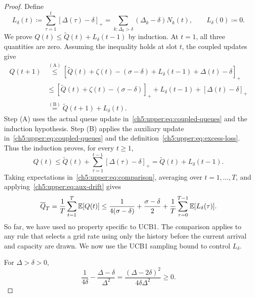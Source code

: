 \begin{proof}
Define
\begin{equation}
 L_\delta(t)\coloneqq\sum_{\tau=1}^{t}[\Delta(\tau)-\delta]_+
 =\sum_{k:\Delta_k>\delta}(\Delta_k-\delta)N_k(t),
 \qquad L_\delta(0)\coloneqq0.
 \label{ch5:upper:eq:excess-loss}
\end{equation}
We prove $Q(t)\le\widetilde Q(t)+L_\delta(t-1)$ by induction.
At $t=1$, all three quantities are zero. Assuming the inequality holds
at slot $t$, the coupled updates give
\begin{equation*}
\begin{aligned}
Q(t+1)
&\overset{\mathrm{(A)}}{\le}
 [\widetilde Q(t)+\zeta(t)-(\sigma-\delta)
   +L_\delta(t-1)+\Delta(t)-\delta]_+\\
&\le
 [\widetilde Q(t)+\zeta(t)-(\sigma-\delta)]_+
 +L_\delta(t-1)+[\Delta(t)-\delta]_+\\
&\overset{\mathrm{(B)}}{=}\widetilde Q(t+1)+L_\delta(t).
\end{aligned}
\end{equation*}
Step (A) uses the actual queue update in~\eqref{ch5:upper:eq:coupled-queues}
and the induction hypothesis.
Step (B) applies the auxiliary update in~\eqref{ch5:upper:eq:coupled-queues}
and the definition~\eqref{ch5:upper:eq:excess-loss}.
Thus the induction proves, for every $t\ge1$,
\begin{equation}
 Q(t)\le\widetilde Q(t)+\sum_{\tau=1}^{t-1}[\Delta(\tau)-\delta]_+
 =\widetilde Q(t)+L_\delta(t-1).
 \label{ch5:upper:eq:comparison}
\end{equation}
Taking expectations in~\eqref{ch5:upper:eq:comparison}, averaging over
$t=1,\ldots,T$, and applying~\eqref{ch5:upper:eq:aux-drift} gives
\begin{equation}
 \overline Q_T=\frac1T\sum_{t=1}^{T}\mathbb{E}[Q(t)]
 \le\frac{1}{4(\sigma-\delta)}+\frac{\sigma-\delta}{2}
 +\frac1T\sum_{\tau=0}^{T-1}\mathbb{E}[L_\delta(\tau)].
 \label{ch5:upper:eq:comparison-transfer}
\end{equation}
So far, we have used no property specific to UCB1. The comparison applies
to any rule that selects a grid rate using only the history before the
current arrival and capacity are drawn. We now use the UCB1 sampling
bound to control $L_\delta$.

For $\Delta>\delta>0$,
\begin{equation}
 \frac1{4\delta}-\frac{\Delta-\delta}{\Delta^2}
 =\frac{(\Delta-2\delta)^2}{4\delta\Delta^2}\ge0.
 \label{ch5:upper:eq:gap-product-bound}
\end{equation}


\end{proof}
